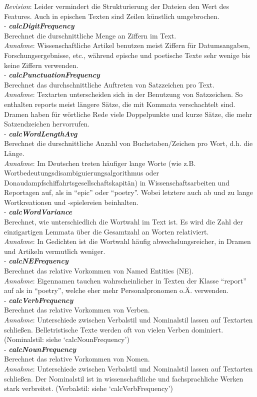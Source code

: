 \documentclass[]{article}
\begin{document}
\emph{Revision}: Leider vermindert die Strukturierung der Dateien den
Wert des Features. Auch in epischen Texten sind Zeilen künstlich
umgebrochen. \\
- \textbf{\emph{calcDigitFrequency}}\\
Berechnet die durschnittliche Menge an Ziffern im Text.\\
\emph{Annahme}: Wissenschaftliche Artikel benutzen meist Ziffern für
Datumsangaben, Forschungsergebnisse, etc., während epische und poetische
Texte sehr wenige bis keine Ziffern verwenden.\\
- \textbf{\emph{calcPunctuationFrequency}}\\
Berechnet das durchschnittliche Auftreten von Satzzeichen pro Text.\\
\emph{Annahme}: Textarten unterscheiden sich in der Benutzung von
Satzzeichen. So enthalten reports meist längere Sätze, die mit Kommata
verschachtelt sind. Dramen haben für wörtliche Rede viele Doppelpunkte
und kurze Sätze, die mehr Satzendzeichen hervorrufen. \\ 
- \textbf{\emph{calcWordLengthAvg}}\\
Berechnet die durschnittliche Anzahl von Buchstaben/Zeichen pro Wort,
d.h. die Länge.\\
\emph{Annahme}: Im Deutschen treten häufiger lange Worte (wie z.B.
Wortbedeutungsdisambiguierungsalgorithmus oder
Donaudampfschiffahrtsgesellschaftskapitän) in Wissenschaftsarbeiten und
Reportagen auf, als in ``epic'' oder ``poetry''. Wobei letztere auch ab
und zu lange Wortkreationen und -spielereien beinhalten.\\ -
\textbf{\emph{calcWordVariance}}\\
Berechnet, wie unterschiedlich die Wortwahl im Text ist. Es wird die
Zahl der einzigartigen Lemmata über die Gesamtzahl an Worten
relativiert.\\
\emph{Annahme}: In Gedichten ist die Wortwahl häufig
abwechslungsreicher, in Dramen und Artikeln vermutlich weniger.\\
- \textbf{\emph{calcNEFrequency}}\\
Berechnet das relative Vorkommen von Named Entities (NE).\\
\emph{Annahme}: Eigennamen tauchen wahrscheinlicher in Texten der Klasse
``report'' auf als in ``poetry'', welche eher mehr Personalpronomen o.Ä.
verwenden.\\
- \textbf{\emph{calcVerbFrequency}}\\
Berechnet das relative Vorkommen von Verben.\\
\emph{Annahme}: Unterschiede zwischen Verbalstil und Nominalstil lassen
auf Textarten schließen. Belletristische Texte werden oft von vielen
Verben dominiert. (Nominalstil: siehe `calcNounFrequency')\\
- \textbf{\emph{calcNounFrequency}}\\
Berechnet das relative Vorkommen von Nomen.\\
\emph{Annahme}: Unterschiede zwischen Verbalstil und Nominalstil lassen
auf Textarten schließen. Der Nominalstil ist in wissenschaftliche und
fachsprachliche Werken stark verbreitet. (Verbalstil: siehe
`calcVerbFrequency')
\end{document}
